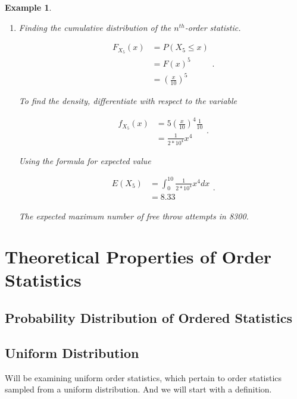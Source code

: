 \documentclass[11pt,a4paper]{article}
\theoremstyle{plain}
\newtheorem{exmp}[fact]{Example}
\begin{document}
\begin{exmp}
\begin{enumerate}
\begin{center}
\end{center}

The 32\% probability that minimum number of free throw attempts being in the desired range.

   \item  Finding the cumulative distribution of the $n^{th}$-order statistic.  
  \begin{center}
 \[
     \begin{array}{ll} 
F_{X_5}(x)&=P(X_5 \leq x )\\
&=F(x)^5\\
&=(\frac{x}{10})^5
\end{array}
             .
   \]
\end{center}
To find the density, differentiate with respect to the variable
\begin{center}
\[
     \begin{array}{ll} 
f_{X_5}(x)&=5(\frac{x}{10})^4\frac{1}{10}\\
&=\frac{1}{2*10^4}x^4
\end{array}
             .
   \]

\end{center}
Using the formula for expected value
\begin{center}
\[
     \begin{array}{ll} 
E(X_5)&=\int_0^{10}\frac{1}{2*10^4}x^4dx\\
&=8.33
\end{array}
             .
   \]

\end{center}
The expected maximum number of free throw attempts in 8300.
\end{enumerate}




 \end{exmp}

\newpage 
\section{Theoretical Properties of Order Statistics}

\subsection{Probability Distribution of Ordered Statistics}

\subsection*{Uniform Distribution}
Will be examining uniform order statistics, which pertain to order statistics sampled from a uniform distribution. And we will start with a definition.
\end{document}
